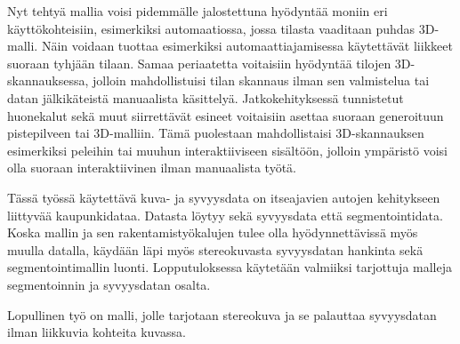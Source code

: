 Nyt tehtyä mallia voisi pidemmälle jalostettuna hyödyntää moniin eri käyttökohteisiin, esimerkiksi automaatiossa, jossa tilasta vaaditaan puhdas 3D-malli.  
Näin voidaan tuottaa esimerkiksi automaattiajamisessa käytettävät liikkeet suoraan tyhjään tilaan.  
Samaa periaatetta voitaisiin hyödyntää tilojen 3D-skannauksessa,  
jolloin mahdollistuisi tilan skannaus ilman sen valmistelua tai datan jälkikäteistä manuaalista käsittelyä.  
Jatkokehityksessä tunnistetut huonekalut sekä muut siirrettävät esineet voitaisiin asettaa suoraan generoituun pistepilveen tai 3D-malliin.  
Tämä puolestaan mahdollistaisi 3D-skannauksen esimerkiksi peleihin tai muuhun interaktiiviseen sisältöön,  
jolloin ympäristö voisi olla suoraan interaktiivinen ilman manuaalista työtä.  

Tässä työssä käytettävä kuva- ja syvyysdata on itseajavien autojen kehitykseen liittyvää kaupunkidataa.  
Datasta löytyy sekä syvyysdata että segmentointidata.  
Koska mallin ja sen rakentamistyökalujen tulee olla hyödynnettävissä myös muulla datalla,  
käydään läpi myös stereokuvasta syvyysdatan hankinta sekä segmentointimallin luonti.  
Lopputuloksessa käytetään valmiiksi tarjottuja malleja segmentoinnin ja syvyysdatan osalta.  

Lopullinen työ on malli, jolle tarjotaan stereokuva ja se palauttaa syvyysdatan ilman liikkuvia kohteita kuvassa.  
